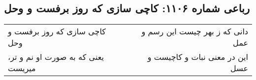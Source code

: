 \begin{center}
\section*{رباعی شماره ۱۱۰۶: کاچی سازی که روز برفست و وحل}
\label{sec:1106}
\begin{longtable}{l p{0.5cm} r}
کاچی سازی که روز برفست و وحل
&&
دانی که ز بهر چیست این رسم و عمل
\\
یعنی که به صورت او نم و تر، میریست
&&
این در معنی نبات و کاچیست و عسل
\\
\end{longtable}
\end{center}
